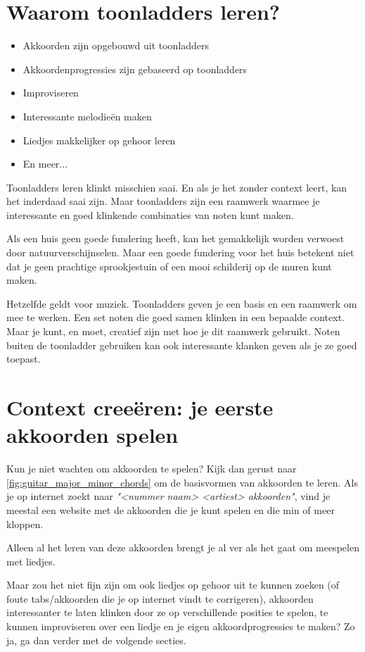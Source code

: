 \section{Waarom toonladders leren?}

\begin{itemize}
    \item Akkoorden zijn opgebouwd uit toonladders
    \item Akkoordenprogressies zijn gebaseerd op toonladders
    \item Improviseren
    \item Interessante melodieën maken
    \item Liedjes makkelijker op gehoor leren
    \item En meer...
\end{itemize}

Toonladders leren klinkt misschien saai. En als je het zonder context leert, kan het inderdaad saai zijn. Maar toonladders zijn een raamwerk waarmee je interessante en goed klinkende combinaties van noten kunt maken.

Als een huis geen goede fundering heeft, kan het gemakkelijk worden verwoest door natuurverschijnselen. Maar een goede fundering voor het huis betekent niet dat je geen prachtige sprookjestuin of een mooi schilderij op de muren kunt maken.

Hetzelfde geldt voor muziek. Toonladders geven je een basis en een raamwerk om mee te werken. Een set noten die goed samen klinken in een bepaalde context. Maar je kunt, en moet, creatief zijn met hoe je dit raamwerk gebruikt. Noten buiten de toonladder gebruiken kan ook interessante klanken geven als je ze goed toepast.

\section{Context creeëren: je eerste akkoorden spelen}

Kun je niet wachten om akkoorden te spelen? Kijk dan gerust naar \autoref{fig:guitar_major_minor_chords} om de basisvormen van akkoorden te leren. Als je op internet zoekt naar \textit{"<nummer naam> <artiest> akkoorden"}, vind je meestal een website met de akkoorden die je kunt spelen en die min of meer kloppen.

Alleen al het leren van deze akkoorden brengt je al ver als het gaat om meespelen met liedjes.

Maar zou het niet fijn zijn om ook liedjes op gehoor uit te kunnen zoeken (of foute tabs/akkoorden die je op internet vindt te corrigeren), akkoorden interessanter te laten klinken door ze op verschillende posities te spelen, te kunnen improviseren over een liedje en je eigen akkoordprogressies te maken? Zo ja, ga dan verder met de volgende secties.

